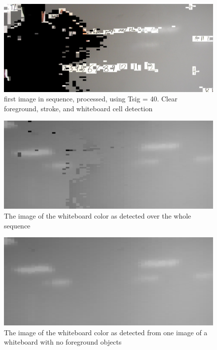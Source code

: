 \documentclass[]{article}
\begin{document}
\begin{figure}[H]
\centering
\includegraphics[scale=0.25]{images/griffin_foreground1}
\caption{first image in sequence, processed, using Tsig = 40.  Clear foreground, stroke, and whiteboard cell detection}
\end{figure}
		
\begin{figure}[H]
\centering
\includegraphics[scale=0.25]{images/background_overtime}
\caption{The image of the whiteboard color as detected over the whole sequence}
\end{figure}	

\begin{figure}[H]
\centering
\includegraphics[scale=0.2]{images/whiteboard_single}
\caption{The image of the whiteboard color as detected from one image of a whiteboard with no foreground objects}
\end{figure}		
\end{document}
